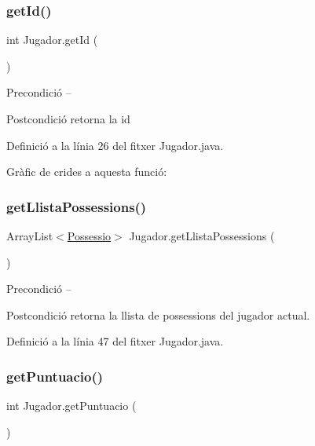 \subsubsection{\texorpdfstring{get\+Id()}{getId()}}
{\footnotesize\ttfamily int Jugador.\+get\+Id (\begin{DoxyParamCaption}{ }\end{DoxyParamCaption})}

\begin{DoxyPrecond}{Precondició}
-- 
\end{DoxyPrecond}
\begin{DoxyPostcond}{Postcondició}
retorna la id 
\end{DoxyPostcond}


Definició a la línia 26 del fitxer Jugador.\+java.

Gràfic de crides a aquesta funció\+:
\mbox{\label{class_jugador_a911338c762d6a518ec628a6fde94ab5b}} 
\subsubsection{\texorpdfstring{get\+Llista\+Possessions()}{getLlistaPossessions()}}
{\footnotesize\ttfamily Array\+List$<$\mbox{\hyperlink{class_possessio}{Possessio}}$>$ Jugador.\+get\+Llista\+Possessions (\begin{DoxyParamCaption}{ }\end{DoxyParamCaption})}

\begin{DoxyPrecond}{Precondició}
-- 
\end{DoxyPrecond}
\begin{DoxyPostcond}{Postcondició}
retorna la llista de possessions del jugador actual. 
\end{DoxyPostcond}


Definició a la línia 47 del fitxer Jugador.\+java.

\mbox{\label{class_jugador_a495f4c17e7ead8bf4be596e6fe28fbe8}} 
\subsubsection{\texorpdfstring{get\+Puntuacio()}{getPuntuacio()}}
{\footnotesize\ttfamily int Jugador.\+get\+Puntuacio (\begin{DoxyParamCaption}{ }\end{DoxyParamCaption})}

